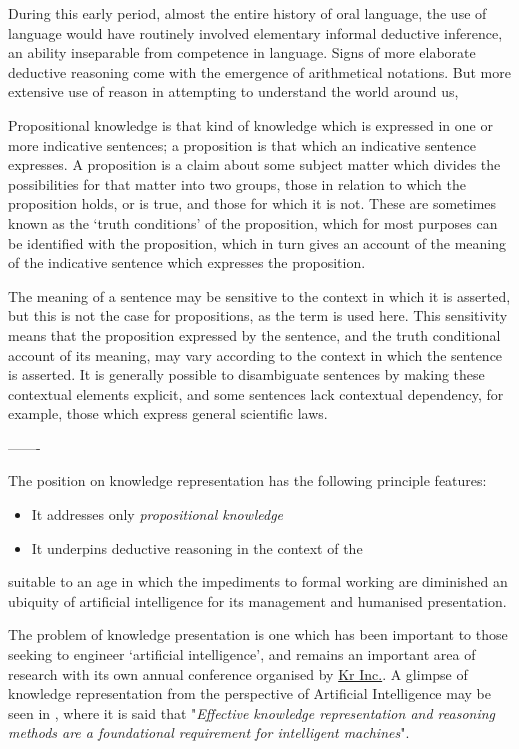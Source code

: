 \documentclass[10pt,titlepage]{book}
\begin{document}
During this early period, almost the entire history of oral language, the use of language would have routinely involved elementary informal deductive inference, an ability inseparable from competence in language.
Signs of more elaborate deductive reasoning come with the emergence of arithmetical notations.
But more extensive use of reason in attempting to understand the world around us,


Propositional knowledge is that kind of knowledge which is expressed in one or more indicative sentences; a proposition is that which an indicative sentence expresses.
A proposition is a claim about some subject matter which divides the possibilities for that matter into two groups, those in relation to which the proposition holds, or is true, and those for which it is not.
These are sometimes known as the `truth conditions' of the proposition, which for most purposes can be identified with the proposition, which in turn gives an account of the meaning of the indicative sentence which expresses the proposition.

The meaning of a sentence may be sensitive to the context in which it is asserted, but this is not the case for propositions, as the term is used here.
This sensitivity means that the proposition expressed by the sentence, and the truth conditional account of its meaning, may vary according to the context in which the sentence is asserted.
It is generally possible to disambiguate sentences by making these contextual elements explicit, and some sentences lack contextual dependency, for example, those which express general scientific laws.




-------

The position on knowledge representation has the following principle features:
\begin{itemize}
\item It addresses only \emph{propositional knowledge}

\item It underpins deductive reasoning in the context of the 

  
\end{itemize}
suitable to an age in which the impediments to formal working are diminished an ubiquity of artificial intelligence for its management and humanised presentation.

The problem of knowledge presentation is one which has been important to those seeking to engineer `artificial intelligence', and remains an important area of research with its own annual conference organised by \href{https://kr.org}{Kr Inc.}.
A glimpse of knowledge representation from the perspective of Artificial Intelligence may be seen in \emph{}\cite{fikes20}, where it is said that "\emph{Effective knowledge representation and reasoning methods are a foundational requirement for intelligent machines}".
\end{document}
